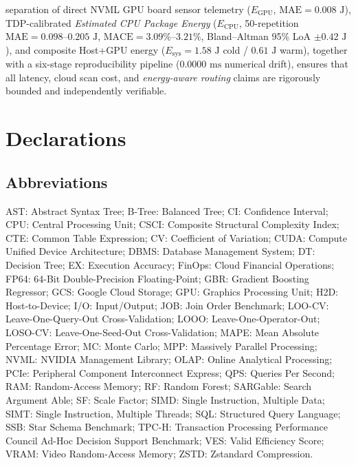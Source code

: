 \documentclass[10pt,a4paper]{article}
\begin{document}
separation of direct NVML GPU board sensor telemetry ($E_{\text{GPU}}$, $\text{MAE}=0.008\text{ J}$), TDP-calibrated \emph{Estimated CPU Package Energy} ($E_{\text{CPU}}$, 50-repetition $\text{MAE}=0.098\text{--}0.205\text{ J}$, $\text{MACE}=3.09\%\text{--}3.21\%$, Bland--Altman 95\% LoA $\pm 0.42\text{ J}$), and composite Host+GPU energy ($E_{\text{sys}}=1.58\text{ J}$ cold / $0.61\text{ J}$ warm), together with a six-stage reproducibility pipeline ($0.0000\text{ ms}$ numerical drift), ensures that all latency, cloud scan cost, and \emph{energy-aware routing} claims are rigorously bounded and independently verifiable.

\section*{Declarations}

\subsection*{Abbreviations}
AST: Abstract Syntax Tree; B-Tree: Balanced Tree; CI: Confidence Interval; CPU: Central Processing Unit; CSCI: Composite Structural Complexity Index; CTE: Common Table Expression; CV: Coefficient of Variation; CUDA: Compute Unified Device Architecture; DBMS: Database Management System; DT: Decision Tree; EX: Execution Accuracy; FinOps: Cloud Financial Operations; FP64: 64-Bit Double-Precision Floating-Point; GBR: Gradient Boosting Regressor; GCS: Google Cloud Storage; GPU: Graphics Processing Unit; H2D: Host-to-Device; I/O: Input/Output; JOB: Join Order Benchmark; LOO-CV: Leave-One-Query-Out Cross-Validation; LOOO: Leave-One-Operator-Out; LOSO-CV: Leave-One-Seed-Out Cross-Validation; MAPE: Mean Absolute Percentage Error; MC: Monte Carlo; MPP: Massively Parallel Processing; NVML: NVIDIA Management Library; OLAP: Online Analytical Processing; PCIe: Peripheral Component Interconnect Express; QPS: Queries Per Second; RAM: Random-Access Memory; RF: Random Forest; SARGable: Search Argument Able; SF: Scale Factor; SIMD: Single Instruction, Multiple Data; SIMT: Single Instruction, Multiple Threads; SQL: Structured Query Language; SSB: Star Schema Benchmark; TPC-H: Transaction Processing Performance Council Ad-Hoc Decision Support Benchmark; VES: Valid Efficiency Score; VRAM: Video Random-Access Memory; ZSTD: Zstandard Compression.
\end{document}
